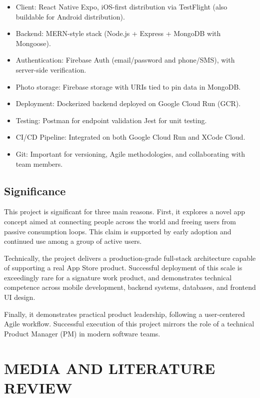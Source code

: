\documentclass[12pt]{article}
\begin{document}
\begin{itemize}[leftmargin=*, itemsep=0.25\baselineskip]
  \item Client: React Native Expo, iOS-first distribution via TestFlight (also buildable for Android distribution).
  \item Backend: MERN-style stack (Node.js + Express + MongoDB with Mongoose).
  \item Authentication: Firebase Auth (email/password and phone/SMS), with server-side verification.
  \item Photo storage: Firebase storage with URIs tied to pin data in MongoDB.
  \item Deployment: Dockerized backend deployed on Google Cloud Run (GCR).
  \item Testing: Postman for endpoint validation Jest for unit testing.
  \item CI/CD Pipeline: Integrated on both Google Cloud Run and XCode Cloud.
  \item Git: Important for versioning, Agile methodologies, and collaborating with team members.
\end{itemize}

\subsection{Significance}
This project is significant for three main reasons. First, it explores a novel app concept aimed at connecting people across the world and freeing users from passive consumption loops. This claim is supported by early adoption and continued use among a group of active users.

Technically, the project delivers a production-grade full-stack architecture capable of supporting a real App Store product. Successful deployment of this scale is exceedingly rare for a signature work product, and demonstrates technical competence across mobile development, backend systems, databases, and frontend UI design.

Finally, it demonstrates practical product leadership, following a user-centered Agile workflow. Successful execution of this project mirrors the role of a technical Product Manager (PM) in modern software teams.

\section{MEDIA AND LITERATURE REVIEW}
\end{document}
